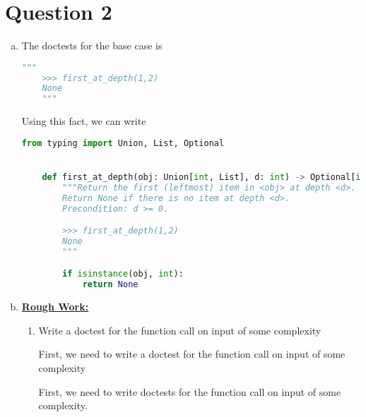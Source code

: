\documentclass[12pt]{article}
\begin{document}
\section*{Question 2}
\begin{enumerate}[a.]
    \item The doctests for the base case is

    \begin{lstlisting}[language=python]
    """
    >>> first_at_depth(1,2)
    None
    """
    \end{lstlisting}

    \bigskip

    Using this fact, we can write

    \begin{lstlisting}[language=python,caption={worksheet\_16\_q2a\_solution}]
    from typing import Union, List, Optional


    def first_at_depth(obj: Union[int, List], d: int) -> Optional[int]:
        """Return the first (leftmost) item in <obj> at depth <d>.
        Return None if there is no item at depth <d>.
        Precondition: d >= 0.

        >>> first_at_depth(1,2)
        None
        """

        if isinstance(obj, int):
            return None
    \end{lstlisting}

    \item

    \bigskip

    \begin{mdframed}
        \underline{\textbf{Rough Work:}}

        \bigskip

        \begin{enumerate}[1.]
            \item Write a doctest for the function call on input of some complexity

            \bigskip

            First, we need to write a doctest for the function call on input of some complexity

            \bigskip

            \begin{mdframed}

            \bigskip

            First, we need to write doctests for the function call on input of some complexity.


\end{mdframed}
\end{enumerate}
\end{mdframed}
\end{enumerate}
\end{document}
